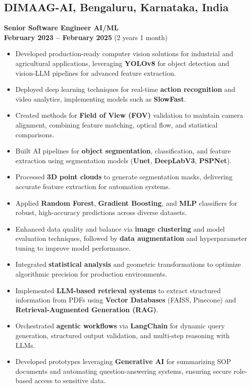 \documentclass[a4paper,10pt]{article}
\begin{document}
\subsection{DIMAAG-AI, Bengaluru, Karnataka, India}
\textbf{Senior Software Engineer AI/ML} \\
\hfill \textbf{February 2023 -- February 2025} (2 years 1 month)
\begin{itemize}
	\item Developed production-ready computer vision solutions for industrial and agricultural applications, leveraging \textbf{YOLOv8} for object detection and vision-LLM pipelines for advanced feature extraction.
	\item Deployed deep learning techniques for real-time \textbf{action recognition} and video analytics, implementing models such as \textbf{SlowFast}.
	\item Created methods for \textbf{Field of View (FOV)} validation to maintain camera alignment, combining feature matching, optical flow, and statistical comparisons.
	\item Built AI pipelines for \textbf{object segmentation}, classification, and feature extraction using segmentation models (\textbf{Unet}, \textbf{DeepLabV3}, \textbf{PSPNet}).
	\item Processed \textbf{3D point clouds} to generate segmentation masks, delivering accurate feature extraction for automation systems.
	\item Applied \textbf{Random Forest}, \textbf{Gradient Boosting}, and \textbf{MLP} classifiers for robust, high-accuracy predictions across diverse datasets.
	
	\item Enhanced data quality and balance via \textbf{image clustering} and model evaluation techniques, followed by \textbf{data augmentation} and hyperparameter tuning to improve model performance.
	\item Integrated \textbf{statistical analysis} and geometric transformations to optimize algorithmic precision for production environments.
	
	\item Implemented \textbf{LLM-based retrieval systems} to extract structured information from PDFs using \textbf{Vector Databases} (FAISS, Pinecone) and \textbf{Retrieval-Augmented Generation (RAG)}.
	\item Orchestrated \textbf{agentic workflows} via \textbf{LangChain} for dynamic query generation, structured output validation, and multi-step reasoning with LLMs.
	\item Developed prototypes leveraging \textbf{Generative AI} for summarizing SOP documents and automating question-answering systems, ensuring secure role-based access to sensitive data.
	

\end{itemize}
\end{document}
